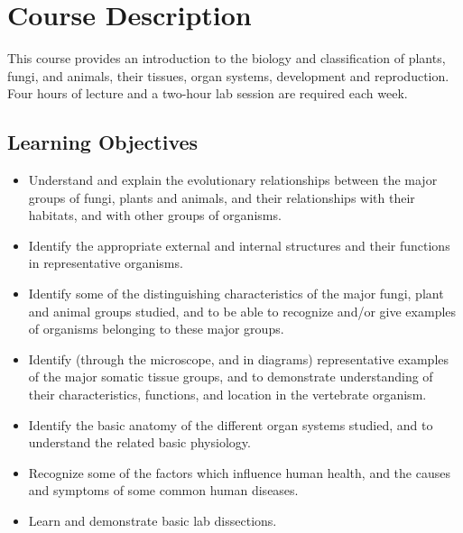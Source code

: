 \chapter{Course Description}\label{course-description}


This course provides an introduction to the biology and classification
of plants, fungi, and animals, their tissues, organ systems, development
and reproduction. Four hours of lecture and a two-hour lab session are
required each week.

\section*{Learning Objectives}\label{learning-objectives}

\begin{itemize}
\item
  Understand and explain the evolutionary relationships between the
  major groups of fungi, plants and animals, and their relationships
  with their habitats, and with other groups of organisms.
\item
  Identify the appropriate external and internal structures and their
  functions in representative organisms.
\item
  Identify some of the distinguishing characteristics of the major
  fungi, plant and animal groups studied, and to be able to recognize
  and/or give examples of organisms belonging to these major groups.
\item
  Identify (through the microscope, and in diagrams) representative
  examples of the major somatic tissue groups, and to demonstrate
  understanding of their characteristics, functions, and location in the
  vertebrate organism.
\item
  Identify the basic anatomy of the different organ systems studied, and
  to understand the related basic physiology.
\item
  Recognize some of the factors which influence human health, and the
  causes and symptoms of some common human diseases.
\item
  Learn and demonstrate basic lab dissections.
\end{itemize}
